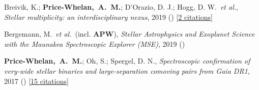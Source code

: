 \item[{\color{deemph}\scriptsize3}]Breivik, K.; \textbf{Price-Whelan,~A.~M.}; D'Orazio, D. J.; Hogg, D. W.~\textit{et al.}, \textit{Stellar multiplicity: an interdisciplinary nexus}, 2019 () [\href{http://adsabs.harvard.edu/abs/2019arXiv190305094B}{2 citations}]

\item[{\color{deemph}\scriptsize2}]Bergemann, M.~\textit{et al.}~(incl. \textbf{APW}), \textit{Stellar Astrophysics and Exoplanet Science with the Maunakea Spectroscopic Explorer (MSE)}, 2019 ()

\item[{\color{deemph}\scriptsize1}]\textbf{Price-Whelan,~A.~M.}; Oh, S.; Spergel, D. N., \textit{Spectroscopic confirmation of very-wide stellar binaries and large-separation comoving pairs from Gaia DR1}, 2017 () [\href{http://adsabs.harvard.edu/abs/2017arXiv170903532P}{15 citations}]